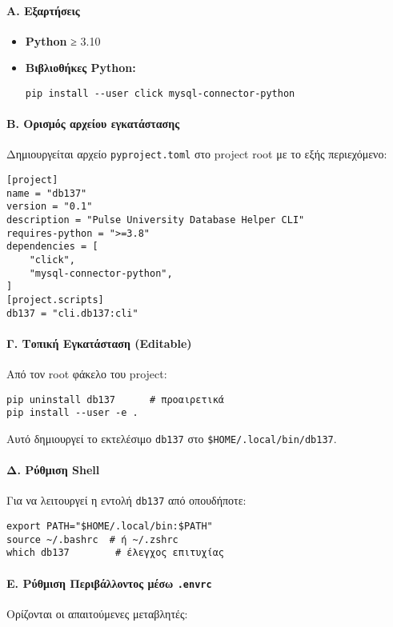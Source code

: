 \documentclass[13pt]{extarticle}
\begin{document}
\paragraph{Α. Εξαρτήσεις}
\begin{itemize}
    \item \textbf{Python} ≥ 3.10
    \item \textbf{Βιβλιοθήκες Python:}
\begin{verbatim}
pip install --user click mysql-connector-python
\end{verbatim}
\end{itemize}

\paragraph{Β. Ορισμός αρχείου εγκατάστασης}
Δημιουργείται αρχείο \texttt{pyproject.toml} στο project root με το εξής περιεχόμενο:

\begin{verbatim}
[project]
name = "db137"
version = "0.1"
description = "Pulse University Database Helper CLI"
requires-python = ">=3.8"
dependencies = [
    "click",
    "mysql-connector-python",
]
[project.scripts]
db137 = "cli.db137:cli"
\end{verbatim}

\paragraph{Γ. Τοπική Εγκατάσταση (Editable)}
Από τον root φάκελο του project:

\begin{verbatim}
pip uninstall db137      # προαιρετικά
pip install --user -e .
\end{verbatim}

Αυτό δημιουργεί το εκτελέσιμο \texttt{db137} στο \texttt{\$HOME/.local/bin/db137}.

\paragraph{Δ. Ρύθμιση Shell}
Για να λειτουργεί η εντολή \texttt{db137} από οπουδήποτε:

\begin{verbatim}
export PATH="$HOME/.local/bin:$PATH"
source ~/.bashrc  # ή ~/.zshrc
which db137        # έλεγχος επιτυχίας
\end{verbatim}

\paragraph{Ε. Ρύθμιση Περιβάλλοντος μέσω \texttt{.envrc}}
Ορίζονται οι απαιτούμενες μεταβλητές:
\end{document}
